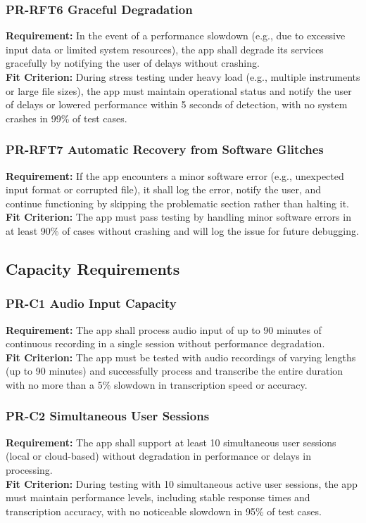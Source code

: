 \documentclass[12pt]{article}
\begin{document}
\subsubsection*{PR-RFT6 Graceful Degradation}
\textbf{Requirement:} In the event of a performance slowdown (e.g., due to excessive input data or limited system resources), the app shall degrade its services gracefully by notifying the user of delays without crashing.\\
\textbf{Fit Criterion:} During stress testing under heavy load (e.g., multiple instruments or large file sizes), the app must maintain operational status and notify the user of delays or lowered performance within 5 seconds of detection, with no system crashes in 99\% of test cases.
\subsubsection*{PR-RFT7 Automatic Recovery from Software Glitches}
\textbf{Requirement:} If the app encounters a minor software error (e.g., unexpected input format or corrupted file), it shall log the error, notify the user, and continue functioning by skipping the problematic section rather than halting it.\\
\textbf{Fit Criterion:} The app must pass testing by handling minor software errors in at least 90\% of cases without crashing and will log the issue for future debugging.

\subsection{Capacity Requirements}
\subsubsection*{PR-C1 Audio Input Capacity}
\textbf{Requirement:} The app shall process audio input of up to 90 minutes of continuous recording in a single session without performance degradation.\\
\textbf{Fit Criterion:} The app must be tested with audio recordings of varying lengths (up to 90 minutes) and successfully process and transcribe the entire duration with no more than a 5\% slowdown in transcription speed or accuracy.
\subsubsection*{PR-C2 Simultaneous User Sessions}
\textbf{Requirement:} The app shall support at least 10 simultaneous user sessions (local or cloud-based) without degradation in performance or delays in processing.\\
\textbf{Fit Criterion:} During testing with 10 simultaneous active user sessions, the app must maintain performance levels, including stable response times and transcription accuracy, with no noticeable slowdown in 95\% of test cases.
\end{document}
